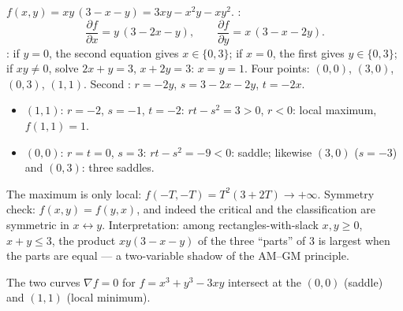 \begin{example}
\label{ex:b1:multivar:fourpoints}
$f(x, y) = xy\,(3 - x - y) = 3xy - x^2y - xy^2$. :
\[
\frac{\partial f}{\partial x} = y\,(3 - 2x - y),
\qquad
\frac{\partial f}{\partial y} = x\,(3 - x - 2y).
\]
: if $y = 0$, the second equation gives $x \in
\{0, 3\}$; if $x = 0$, the first gives $y \in \{0, 3\}$; if $xy
\neq 0$, solve $2x + y = 3$, $x + 2y = 3$: $x = y = 1$. Four
points: $(0,0)$, $(3,0)$, $(0,3)$, $(1,1)$. Second :
$r = -2y$, $s = 3 - 2x - 2y$, $t = -2x$.
\begin{itemize}
  \item $(1,1)$: $r = -2$, $s = -1$, $t = -2$: $rt - s^2 = 3 >
        0$, $r < 0$: local maximum, $f(1,1) = 1$.
  \item $(0,0)$: $r = t = 0$, $s = 3$: $rt - s^2 = -9 < 0$:
        saddle; likewise $(3, 0)$ ($s = -3$) and $(0, 3)$: three
        saddles.
\end{itemize}
The maximum is only local: $f(-T, -T) = T^2(3 + 2T) \to
+\infty$. Symmetry check: $f(x, y) = f(y, x)$, and indeed the
critical  and the classification are symmetric in $x
\leftrightarrow y$. Interpretation: among rectangles-with-slack
$x, y \geq 0$, $x + y \leq 3$, the product $xy(3 - x - y)$ of
the three ``parts'' of $3$ is largest when the parts are equal
--- a two-variable shadow of the AM--GM principle.
\end{example}

\begin{omfigure}

{\small The two curves $\nabla f = 0$ for $f = x^3 + y^3 - 3xy$
intersect at the  $(0,0)$ (saddle) and $(1,1)$
(local minimum).}
\end{omfigure}


